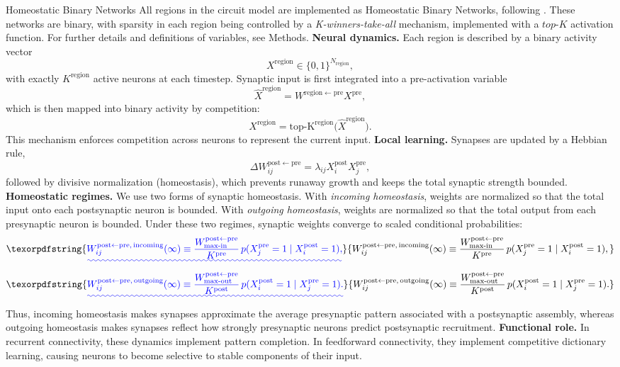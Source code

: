 \documentclass{article}
\providecommand{\DIFaddtex}[1]{{\protect\color{blue}\uwave{#1}}} %
\providecommand{\DIFaddbegin}{} %
\providecommand{\DIFaddend}{} %
\providecommand{\DIFadd}[1]{\texorpdfstring{\DIFaddtex{#1}}{#1}} %
\begin{document}
\begin{technicalbox}{Homeostatic Binary Networks}
All regions in the circuit model are implemented as Homeostatic Binary Networks, following . These networks are binary, with sparsity in each region being controlled by a \textit{K-winners-take-all} mechanism, implemented with a $top$-$K$ activation function. For further details and definitions of variables, see Methods.
\newline\newline
\textbf{Neural dynamics.} Each region is described by a binary activity vector
\[
X^\mathrm{region}\in\{0,1\}^{N_\mathrm{region}},
\]
with exactly $K^\mathrm{region}$ active neurons at each timestep. Synaptic input is first integrated into a pre-activation variable
\[
\hat{X}^\mathrm{region}
=
W^{\mathrm{region}\leftarrow\mathrm{pre}}X^\mathrm{pre},
\]
which is then mapped into binary activity by competition:
\[
X^\mathrm{region}
=
\operatorname{top\text{-}K^\mathrm{region}}
\big(\hat{X}^\mathrm{region}\big).
\]
This mechanism enforces competition across neurons to represent the current \DIFaddbegin \DIFadd{synaptic }\DIFaddend input.
\newline\newline
\textbf{Local learning.} Synapses are updated by a Hebbian rule,
\[
\Delta W_{ij}^{\mathrm{post}\leftarrow\mathrm{pre}}
=
\lambda_{ij}X_i^\mathrm{post}X_j^\mathrm{pre},
\]
followed by divisive normalization (homeostasis), which prevents runaway growth and keeps the total synaptic strength bounded.
\newline\newline
\textbf{Homeostatic regimes.} We use two forms of synaptic homeostasis. With \textit{incoming homeostasis}, weights are normalized so that the total input onto each postsynaptic neuron is bounded. With \textit{outgoing homeostasis}, weights are normalized so that the total output from each presynaptic neuron is bounded. Under these two regimes, synaptic weights converge to scaled conditional probabilities:
 \DIFaddbegin \[
\DIFadd{W_{ij}^{\mathrm{post}\leftarrow\mathrm{pre},\,\mathrm{incoming}}(\infty)
\equiv
\frac{W_{\mathrm{max\text{-}in}}^{\mathrm{post}\leftarrow\mathrm{pre}}}{K^\mathrm{pre}}
\,p(X_j^\mathrm{pre}=1\mid X_i^\mathrm{post}=1),
}\]\DIFaddend 
 \DIFaddbegin \[
\DIFadd{W_{ij}^{\mathrm{post}\leftarrow\mathrm{pre},\,\mathrm{outgoing}}(\infty)
\equiv
\frac{W_{\mathrm{max\text{-}out}}^{\mathrm{post}\leftarrow\mathrm{pre}}}{K^\mathrm{post}}
\,p(X_i^\mathrm{post}=1\mid X_j^\mathrm{pre}=1).
}\]\DIFaddend 
Thus, incoming homeostasis makes synapses approximate the average presynaptic pattern associated with a postsynaptic assembly, whereas outgoing homeostasis makes synapses reflect how strongly presynaptic neurons predict postsynaptic recruitment.
\newline\newline
\textbf{Functional role.} In recurrent connectivity, these dynamics implement pattern completion. In feedforward connectivity, they implement competitive dictionary learning, causing neurons to become selective to stable components of their input.
\end{technicalbox}
\end{document}
